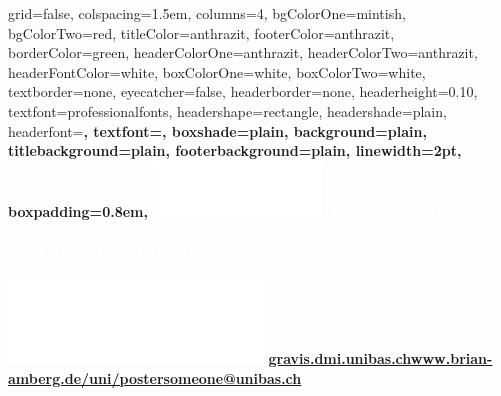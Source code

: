 \documentclass[portrait,final,paperwidth=84.10cm, paperheight=118.90cm,showframe fontscale=0.277,margin=1.5cm]{baposter}
\begin{document}

\begin{poster}%
	{
		grid=false,
		colspacing=1.5em,
		columns=4,
		bgColorOne=mintish,
		bgColorTwo=red,
		titleColor=anthrazit,
		footerColor=anthrazit,
		borderColor=green,
		headerColorOne=anthrazit,
		headerColorTwo=anthrazit,
		headerFontColor=white,
		boxColorOne=white,
		boxColorTwo=white,
		textborder=none,
		eyecatcher=false,
		headerborder=none,
		headerheight=0.10\textheight,
		textfont=professionalfonts, %
		headershape=rectangle, %
		headershade=plain, %
		headerfont=\large\bf\textsc, %
		textfont={\setlength{\parindent}{1.5em}},
		boxshade=plain,
		background=plain, %
		titlebackground=plain, %
		footerbackground=plain, %
		linewidth=2pt,
		boxpadding=0.8em,
	}
	{
		\includegraphics[height=4.0em]{logo/UniBas_Logo_EN_Weiss_Trans_RGB_55}
	} 
	{\textcolor{white}{\Huge\bf\textsc{A very very very long multi-line \\paper title}}\vspace{0.2em}}
	{\textcolor{white}{\normalsize{
				\hspace{-0.2em}\textbf{\underline{Author 1}}, Author 2 and Author 3\\
				Department of Mathematics and Computer Science, University of Basel
			}
		}
	}
	{%
			\includegraphics[height=6.0em]{logo/UniBas_Logo_EN_Weiss_Trans_RGB_55}
	}
	{
		{\textcolor{lightgray}{\normalsize{\bf{
						\noindent \url{gravis.dmi.unibas.ch}\hfill \url{www.brian-amberg.de/uni/poster}\hfill \href{mailto:someone@unibas.ch}{someone@unibas.ch} 
					}
				}
			}
		}
	}
	

\end{poster}
\end{document}
